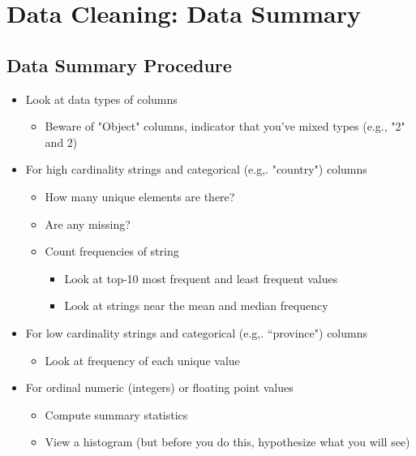 \documentclass[11pt]{article}
\theoremstyle{definition}
\begin{document}
\section{Data Cleaning: Data Summary}
\subsection{Data Summary Procedure}
\begin{itemize}
    \item Look at data types of columns
    \begin{itemize}
        \item Beware of "Object" columns, indicator that you've mixed types (e.g., "2" and 2)
    \end{itemize}
    \item For high cardinality strings and categorical (e.g,. "country") columns
    \begin{itemize}
        \item How many unique elements are there?
        \item Are any missing?
        \item Count frequencies of string
        \begin{itemize}
            \item Look at top-10 most frequent and least frequent values
            \item Look at strings near the mean and median frequency
        \end{itemize}
    \end{itemize}
    \item For low cardinality strings and categorical (e.g,. “province") columns
    \begin{itemize}
        \item Look at frequency of each unique value
    \end{itemize}
    \item For ordinal numeric (integers) or floating point values
    \begin{itemize}
        \item Compute summary statistics
        \item View a histogram (but before you do this, hypothesize what you will see)
    \end{itemize}
\end{itemize}
\end{document}
